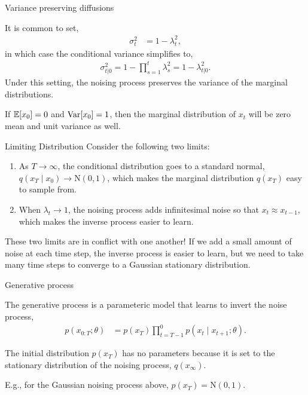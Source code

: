 \documentclass[aspectratio=169]{beamer}
\begin{document}
\begin{frame}[t,allowframebreaks]{Variance preserving
diffusions}\label{variance-preserving-diffusions}

It is common to set, 
\begin{align*}
\sigma_t^2 &= 1-\lambda_t^2,
\end{align*} 
in which case the conditional variance simplifies to,
\begin{align*}
\sigma_{t|0}^2 = 1 - \prod_{s=1}^t \lambda_s^2 = 1 - \lambda_{t|0}^2.
\end{align*} 
Under this setting, the noising process preserves the
variance of the marginal distributions. 

If \(\mathbb{E}[x_0] = 0\) and
\(\textrm{Var}[x_0] = 1\), then the marginal distribution of \(x_t\) will be
zero mean and unit variance as well.
\end{frame}

\begin{frame}[t,allowframebreaks]{Limiting Distribution}
Consider the following two limits: 

\begin{enumerate}
    \item As \(T \to \infty\), the conditional distribution goes to a standard normal,
\(q(x_T \mid x_0) \to \mathrm{N}(0, 1)\), which makes the marginal
distribution \(q(x_T)\) easy to sample from.

    \item When \(\lambda_t \to 1\), the noising process adds infinitesimal noise
  so that \(x_t \approx x_{t-1}\), which makes the inverse process
  easier to learn.
\end{enumerate}

These two limits are in conflict with one another! If we add
a small amount of noise at each time step, the inverse process is easier
to learn, but we need to take many time steps to converge to a Gaussian
stationary distribution.

\end{frame}

\begin{frame}[t,allowframebreaks]{Generative process}\label{generative-process}

The generative process is a parameteric model that learns to invert the
noise process, 
\begin{align*}
p(x_{0:T}; \theta) &= p(x_T) \prod_{t=T-1}^0 p(x_t \mid x_{t+1}; \theta).
\end{align*} 

The initial distribution \(p(x_T)\) has no parameters
because it is set to the stationary distribution of the noising process,
\(q(x_\infty)\). 

E.g., for the Gaussian noising process above,
\(p(x_T) = \mathrm{N}(0,1)\).

\end{frame}
\end{document}

